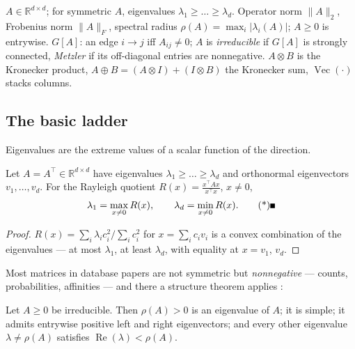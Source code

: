 \begin{remarkbox}[Notation]
$A \in \mathbb{R}^{d \times d}$; for symmetric $A$, eigenvalues $\lambda_1 \ge
\dots \ge \lambda_d$. Operator norm $\|A\|_2$, Frobenius norm $\|A\|_F$,
spectral radius $\rho(A) = \max_i |\lambda_i(A)|$; $A \ge 0$ is entrywise.
$G[A]$: an edge $i \to j$ iff $A_{ij} \ne 0$; $A$ is \emph{irreducible} if
$G[A]$ is strongly connected, \emph{Metzler} if its off-diagonal entries are
nonnegative. $A \otimes B$ is the Kronecker product,
$A \oplus B = (A \otimes I) + (I \otimes B)$ the Kronecker sum,
$\operatorname{Vec}(\cdot)$ stacks columns.
\end{remarkbox}

\subsection{The basic ladder}
\label{sec:spec-ladder}

Eigenvalues are the extreme values of a scalar function of the direction.

\begin{theorem}\label{thm:spec-rayleigh}
Let $A = A^{\top} \in \mathbb{R}^{d \times d}$ have eigenvalues $\lambda_1 \ge
\dots \ge \lambda_d$ and orthonormal eigenvectors $v_1,\dots,v_d$. For the
Rayleigh quotient $R(x) = \frac{x^{\top}\!A x}{x^{\top}x}$, $x \ne 0$,
\[
\lambda_1 = \max_{x \ne 0} R(x),
\qquad \lambda_d = \min_{x \ne 0} R(x). \eopm
\]
\end{theorem}

\begin{proof}
$R(x) = \sum_i \lambda_i c_i^2 / \sum_i c_i^2$ for $x = \sum_i c_i v_i$ is a
convex combination of the eigenvalues --- at most $\lambda_1$, at least
$\lambda_d$, with equality at $x = v_1$, $v_d$.
\end{proof}

Most matrices in database papers are not symmetric but \emph{nonnegative} ---
counts, probabilities, affinities --- and there a structure theorem applies
\citep{spectral-matrix-bg1,spectral-matrix-bg5}:

\begin{theorem}\label{thm:spec-pf}
Let $A \ge 0$ be irreducible. Then $\rho(A) > 0$ is an eigenvalue of $A$; it
is simple; it admits entrywise positive left and right eigenvectors; and
every other eigenvalue $\lambda \ne \rho(A)$ satisfies
$\operatorname{Re}(\lambda) < \rho(A)$. \eop
\end{theorem}

